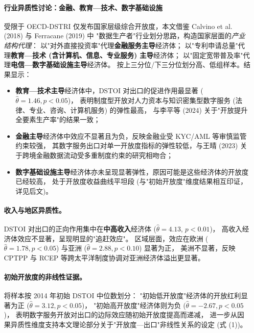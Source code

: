 \documentclass[11pt,a4paper]{article}
\begin{document}
\paragraph{\textbf{行业异质性讨论：金融、教育—技术、数字基础设施}}
受限于 OECD-DSTRI 仅发布国家层级综合开放度，本文借鉴 Calvino et al. (2018) 与 Ferracane (2019) 中
"数据生产者"行业划分思路，构造国家层面的\textit{产业结构代理}：
以"对外直接投资率"代理\textbf{金融服务主导}经济体；
以"专利申请总量"代理\textbf{教育—技术 (含计算机、信息、专业服务) 主导}经济体；
以"固定宽带普及率"代理\textbf{电信—数字基础设施主导}经济体。
按上三分位/下三分位划分高、低组样本。结果显示：

\begin{itemize}[leftmargin=2em]
\item \textbf{教育—技术主导}经济体中，DSTOI 对出口的促进作用最显著 ($\hat\theta=1.46, p<0.05$)，
表明制度型开放对人力资本与知识密集型数字服务 (法律、专业、咨询、计算机服务) 的弹性最高，
与李平等 (2024) 关于"开放提升全要素生产率"的结果一致；
\item \textbf{金融主导}经济体中效应不显著且为负，反映金融业受 KYC/AML 等审慎监管约束较强，
其数字服务出口对单一开放度指标的弹性较低，与王晴 (2023) 关于跨境金融数据流动受多重制度约束的研究相吻合；
\item \textbf{数字基础设施主导}经济体亦未呈现显著弹性，原因可能是这些经济体的开放度已经较高，
处于开放度收益曲线平坦段 (与"初始开放度"维度结果相互印证，详见后文)。
\end{itemize}

\paragraph{\textbf{收入与地区异质性。}}
DSTOI 对出口的正向作用集中在\textbf{中高收入}经济体 ($\hat\theta=4.13$, $p<0.01$)，
高收入经济体效应不显著，呈现明显的"追赶效应"。
区域层面，效应在欧洲 ($\hat\theta=1.78, p<0.05$) 与亚洲 ($\hat\theta=2.88, p<0.10$) 显著为正，
美洲不显著，反映 CPTPP 与 RCEP 等跨太平洋制度协调对亚洲经济体溢出更显著。

\paragraph{\textbf{初始开放度的非线性证据。}}
将样本按 2014 年初始 DSTOI 中位数划分：
"初始低开放度"经济体的开放红利显著为正 ($\hat\theta=3.12, p<0.05$)，
"初始高开放度"经济体则为负 ($\hat\theta=-2.67, p<0.05$)，
表明数字服务开放对出口的边际效应随初始开放度提高而递减，
进一步从因果异质性维度支持本文理论部分关于"开放度—出口"非线性关系的设定 (式 (1))。
\end{document}
